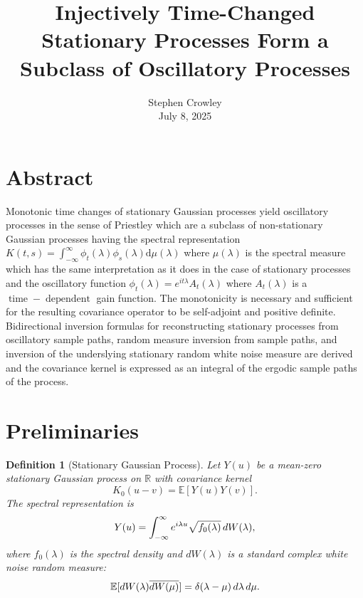 \documentclass{article}
\newcommand{\mathd}{\mathrm{d}}
\newcommand{\tmaffiliation}[1]{\\ #1}
\newcommand{\tmop}[1]{\ensuremath{\operatorname{#1}}}
\newtheorem{definition}{Definition}
\begin{document}
\title{Injectively Time-Changed Stationary Processes Form a Subclass of
Oscillatory Processes}

\author{
  Stephen Crowley
  \tmaffiliation{July 8, 2025}
}

\maketitle

\section*{Abstract}

Monotonic time changes of stationary Gaussian processes yield oscillatory
processes in the sense of Priestley which are a subclass of non-stationary
Gaussian processes having the spectral representation $K (t, s) = \int_{-
\infty}^{\infty} \phi_t (\lambda) \phi_s (\lambda) \mathd \mu (\lambda)$ where
$\mu (\lambda)$ is the spectral measure which has the same interpretation as
it does in the case of stationary processes and the oscillatory function
$\phi_t (\lambda) = e^{i t \lambda} A_t (\lambda)$ where $A_t (\lambda)$ is a
$\tmop{time} - \tmop{dependent}$ gain function. The monotonicity is necessary
and sufficient for the resulting covariance operator to be self-adjoint and
positive definite. Bidirectional inversion formulas for reconstructing
stationary processes from oscillatory sample paths, random measure inversion
from sample paths, and inversion of the underslying stationary random white
noise measure are derived and the covariance kernel is expressed as an
integral of the ergodic sample paths of the process.

{\tableofcontents}

\section{Preliminaries}

\begin{definition}
  [Stationary Gaussian Process] Let $Y (u)$ be a mean-zero stationary Gaussian
  process on $\mathbb{R}$ with covariance kernel
  \[ K_0  (u - v) =\mathbb{E} [Y (u) Y (v)] . \]
  The spectral representation is
  \[ Y (u) = \int_{- \infty}^{\infty} e^{i \lambda u}  \sqrt{f_0 (\lambda)} 
     \hspace{0.17em} dW (\lambda), \]
  where $f_0 (\lambda)$ is the spectral density and $dW (\lambda)$ is a
  standard complex white noise random measure:
  \[ \mathbb{E} [dW (\lambda) \overline{dW (\mu)}] = \delta (\lambda - \mu) 
     \hspace{0.17em} d \lambda \hspace{0.17em} d \mu . \]
\end{definition}
\end{document}
